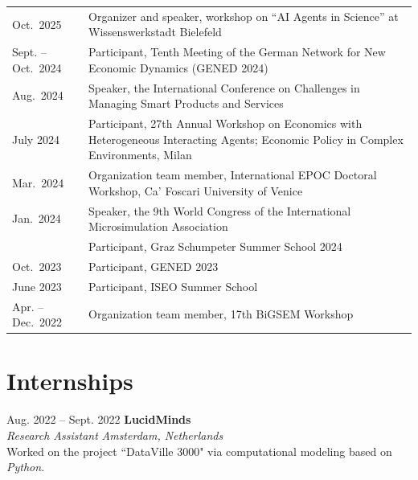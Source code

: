 \documentclass[a4paper,12pt]{article}
\makeatletter
\newenvironment{jobshort}[2]
    {
    \begin{tabularx}{\linewidth}{@{}l X r@{}}
    \textbf{#1} & \hfill &  #2 \\[3.75pt]
    \end{tabularx}
    }
    {
    }
\makeatother
\begin{document}
\begin{tabularx}{\linewidth}{@{}l X@{}}

Oct.\ 2025 & Organizer and speaker, workshop on “AI Agents in Science” at Wissenswerkstadt Bielefeld \\

Sept. -- Oct.\ 2024 & Participant, Tenth Meeting of the German Network for New Economic Dynamics (GENED 2024) \\

Aug.\ 2024 & Speaker, the International Conference on Challenges in Managing Smart Products and Services \\

July 2024 & Participant, 27th Annual Workshop on Economics with Heterogeneous Interacting Agents; Economic Policy in Complex Environments, Milan \\

Mar.\ 2024 & Organization team member, International EPOC Doctoral Workshop, Ca’ Foscari University of Venice \\

Jan.\ 2024 & Speaker, the 9th World Congress of the International Microsimulation Association \\

 & Participant, Graz Schumpeter Summer School 2024 \\

Oct.\ 2023 & Participant, GENED 2023 \\

June 2023 & Participant, ISEO Summer School \\

Apr. -- Dec.\ 2022 & Organization team member, 17th BiGSEM Workshop \\

\end{tabularx}


\section{Internships}

Aug. 2022 -- Sept. 2022 \hfill \textbf{LucidMinds} \\ %
\textit{Research Assistant} \hfill \textit{Amsterdam, Netherlands} \\
\textbullet Worked on the project ``DataVille 3000" via computational modeling based on \textit{Python}. \\
\end{document}

